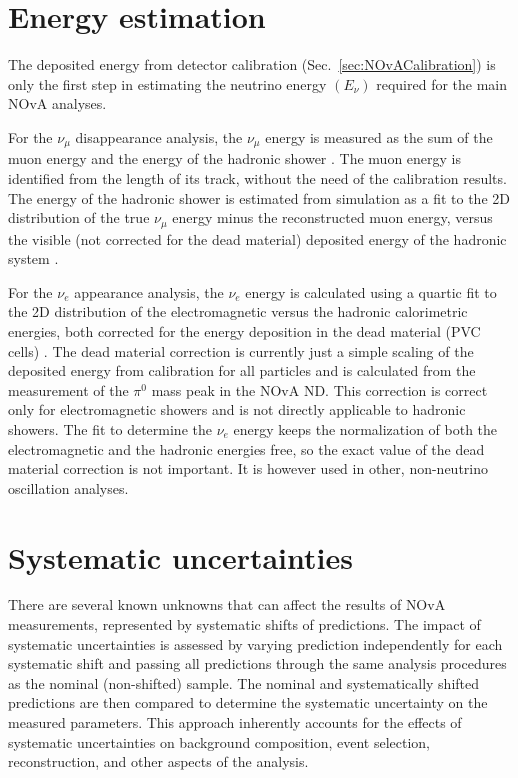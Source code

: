 \section{Energy estimation}\label{sec:NOvAEnergyEstimation}
The deposited energy from detector calibration (Sec.~\ref{sec:NOvACalibration}) is only the first step in estimating the neutrino energy $\left(E_\nu\right)$ required for the main \gls{NOvA} analyses.

For the $\nu_\mu$ disappearance analysis, the $\nu_\mu$ energy is measured as the sum of the muon energy and the energy of the hadronic shower \cite{NOvAResults2021.pdf}. The muon energy is identified from the length of its track, without the need of the calibration results. The energy of the hadronic shower is estimated from simulation as a fit to the 2D distribution of the true $\nu_\mu$ energy minus the reconstructed muon energy, versus the visible (not corrected for the dead material) deposited energy of the hadronic system \cite{PsihasNOvAThesis_ProngCVN.pdf}.

For the $\nu_e$ appearance analysis, the $\nu_e$ energy is calculated using a quartic fit to the 2D distribution of the electromagnetic versus the hadronic calorimetric energies, both corrected for the energy deposition in the dead material (\gls{PVC} cells) \cite{PsihasNOvAThesis_ProngCVN.pdf}. The dead material correction is currently just a simple scaling of the deposited energy from calibration for all particles and is calculated from the measurement of the $\pi^0$ mass peak in the \gls{NOvA} \gls{ND}. This correction is correct only for electromagnetic showers and is not directly applicable to hadronic showers. The fit to determine the $\nu_e$ energy keeps the normalization of both the electromagnetic and the hadronic energies free, so the exact value of the dead material correction is not important. It is however used in other, non-neutrino oscillation analyses.

\section{Systematic uncertainties}\label{sec:NOvASystematics}
There are several known unknowns that can affect the results of \gls{NOvA} measurements, represented by systematic shifts of predictions. The impact of systematic uncertainties is assessed by varying prediction independently for each systematic shift and passing all predictions through the same analysis procedures as the nominal (non-shifted) sample. The nominal and systematically shifted predictions are then compared to determine the systematic uncertainty on the measured parameters. This approach inherently accounts for the effects of systematic uncertainties on background composition, event selection, reconstruction, and other aspects of the analysis.

